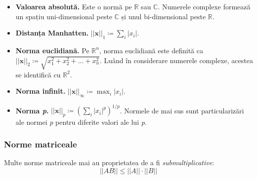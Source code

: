 \documentclass{exam}
\begin{document}
\begin{itemize}
	\item \textbf{Valoarea absolută.} Este o normă pe $\mathbb{R}$ sau
	      $\mathbb{C}$. Numerele complexe formează un spațiu uni-dimensional
	      peste $\mathbb{C}$ și unul bi-dimensional peste $\mathbb{R}$.
	\item \textbf{Distanța Manhatten.} $||\mathbf{x}||_1 \coloneq \sum_{i} |x_i| $.
	\item \textbf{Norma euclidiană.} Pe $\mathbb{R}^n$, norma euclidiană este
	      definită ca $||\mathbf{x}||_2 \coloneq \sqrt{x_1^2 + x_2^2 + \ldots + x_n^2}$. Luând
	      în considerare numerele complexe, acestea se identifică cu $\mathbb{R}^2$.
	\item \textbf{Norma infinit.} $||\mathbf{x}||_{\infty} \coloneq \max_i |x_i|$.
	\item \textbf{Norma \textit{p}.} $||\mathbf{x}||_p \coloneq \left( \sum_{i} |x_i|^p \right)^{1/p}$.
	      Normele de mai sus sunt particularizări ale normei \textit{p} pentru diferite valori ale lui \textit{p}.
\end{itemize}

\subsubsection{Norme matriceale}

Multe norme matriceale mai au proprietatea de a fi \textit{submultiplicative}:
\begin{equation*}
	||AB|| \leq ||A|| \cdot ||B||
\end{equation*}
\end{document}
